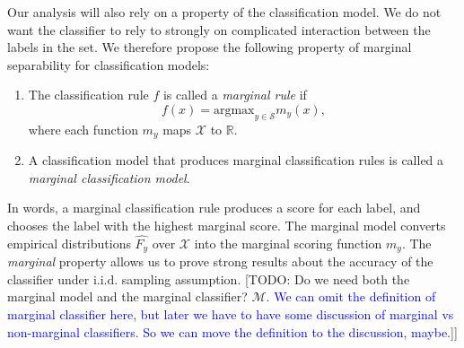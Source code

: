 \documentclass[12pt]{article}
\begin{document}
Our analysis will also rely on a property of the classification model. We do not want the classifier to rely to strongly on complicated interaction between the labels in the set. We therefore propose the following property of marginal separability for classification models: 

\begin{definition}
\begin{enumerate}
\item The classification rule $f$ is called a \emph{marginal rule} if 
\[
f(x) = \text{argmax}_{y \in \mathcal{S}} m_y(x),
\]
where each function $m_y$ maps $\mathcal{X}$ to $\mathbb{R}$.
\item A classification model that produces marginal classification rules is called a \emph{marginal classification model}. 
\end{enumerate}
\end{definition}
In words, a marginal classification rule produces a score for each label, and chooses the label with the highest marginal score. The marginal model converts empirical
distributions $\hat{F_y}$ over $\mathcal{X}$ into the marginal scoring function $m_y$. 
The \emph{marginal} property allows us to prove strong results about
the accuracy of the classifier under i.i.d. sampling
assumption.
[TODO: Do we need both the marginal model and the marginal classifier? $\mathcal{M}$. \textcolor{blue}{We can omit the definition of marginal classifier here, but later we have to have some discussion of marginal vs non-marginal classifiers.  So we can move the definition to the discussion, maybe.}]]
\end{document}
